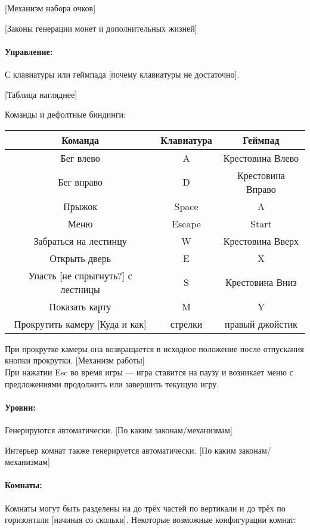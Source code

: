 \documentclass[12pt,a4paper]{article}
\begin{document}
{\color{red} [Механизм набора очков]}

{\color{red} [Законы генерации монет и дополнительных жизней]}

\paragraph{Управление:}
С клавиатуры или геймпада {\color{red} [почему клавиатуры не достаточно]}.

{\color{blue} [Таблица нагляднее]}

Команды и дефолтные биндинги:\\
\begin{tabular}{|c|c|c|}
\hline
Команда & Клавиатура & Геймпад\\
\hline
Бег влево & A & Крестовина Влево \\
\hline
Бег вправо & D & Крестовина Вправо \\
\hline
Прыжок & Space & A \\
\hline
Меню & Escape & Start \\
\hline
Забраться на лестинцу & W & Крестовина Вверх \\
\hline
Открыть дверь & E & X \\
\hline
Упасть {\color{red} [не спрыгнуть?]} с лестницы & S & Крестовина Вниз \\
\hline
Показать карту & M & Y \\
\hline
Прокрутить камеру {\color{red} [Куда и как]} & стрелки & правый джойстик \\
\hline
\end{tabular}

При прокрутке камеры она возвращается в исходное положение после отпускания кнопки прокрутки. {\color{red} [Механизм работы]}\\

При нажатии Esc во время игры --- игра ставится на паузу и возникает меню с предложениями продолжить или завершить текущую игру.

\paragraph{Уровни:}
Генерируются автоматически. {\color{red} [По каким законам/механизмам]}

Интерьер комнат также генерируется автоматически. {\color{red} [По каким законам/механизмам]}

\paragraph{Комнаты:}
Комнаты могут быть разделены на до трёх частей по вертикали и до трёх по горизонтали{\color{red} [начиная со скольки]}. Некоторые возможные конфигурации комнат:\\
\end{document}
